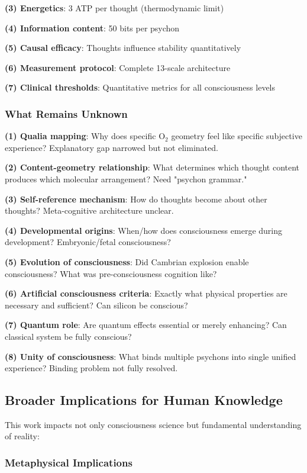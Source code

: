 \documentclass[11pt,onecolumn]{article}
\begin{document}
\textbf{(3) Energetics}: 3 ATP per thought (thermodynamic limit)

\textbf{(4) Information content}: 50 bits per psychon

\textbf{(5) Causal efficacy}: Thoughts influence stability quantitatively

\textbf{(6) Measurement protocol}: Complete 13-scale architecture

\textbf{(7) Clinical thresholds}: Quantitative metrics for all consciousness levels

\subsubsection{What Remains Unknown}

\textbf{(1) Qualia mapping}: Why does specific O$_2$ geometry feel like specific subjective experience? Explanatory gap narrowed but not eliminated.

\textbf{(2) Content-geometry relationship}: What determines which thought content produces which molecular arrangement? Need "psychon grammar."

\textbf{(3) Self-reference mechanism}: How do thoughts become about other thoughts? Meta-cognitive architecture unclear.

\textbf{(4) Developmental origins}: When/how does consciousness emerge during development? Embryonic/fetal consciousness?

\textbf{(5) Evolution of consciousness}: Did Cambrian explosion enable consciousness? What was pre-consciousness cognition like?

\textbf{(6) Artificial consciousness criteria}: Exactly what physical properties are necessary and sufficient? Can silicon be conscious?

\textbf{(7) Quantum role}: Are quantum effects essential or merely enhancing? Can classical system be fully conscious?

\textbf{(8) Unity of consciousness}: What binds multiple psychons into single unified experience? Binding problem not fully resolved.

\subsection{Broader Implications for Human Knowledge}

This work impacts not only consciousness science but fundamental understanding of reality:

\subsubsection{Metaphysical Implications}
\end{document}
